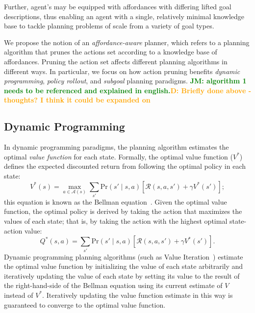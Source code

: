 \documentclass[]{article}
\newcommand{\jmnote}[1]{\textcolor{Green}{\textbf{JM: #1}}}
\newcommand{\dnote}[1]{\textcolor{Orange}{\textbf{D: #1}}}
\begin{document}
Further, agent's may be equipped with affordances with differing lifted
goal descriptions, thus enabling an agent with a single, relatively minimal
knowledge base to tackle planning problems of scale from a variety of goal types.

We propose the notion of an {\it affordance-aware} planner, which refers to
a planning algorithm that prunes the actions set according to a knowledge base
of affordances. Pruning the action set affects different planning algorithms in
different ways. In particular, we focus on how action pruning benefits
{\em dynamic programming}, {\em policy rollout}, and {\em subgoal} planning paradigms. \jmnote{algorithm 1 needs to be referenced and explained in english.}\dnote{Briefly done above - thoughts? I think it could be expanded on}

\subsection{Dynamic Programming}
In dynamic programming paradigms, the planning algorithm estimates the
optimal {\em value function} for each state. Formally, the optimal
value function ($V^*$) defines the expected discounted return from
following the optimal policy in each state:
\begin{equation}
\label{eq:bellman}
V^*(s) = \max_{a \in \mathcal{A}(s)} \sum_{s'} \text{Pr}(s' \mid s, a)\left[\mathcal{R}(s,a,s') + \gamma V^*(s') \right];
\end{equation}
this equation is known as the Bellman
equation~\citep{bellman57}. Given the optimal value function, the
optimal policy is derived by taking the action that maximizes the
values of each state; that is, by taking the action with the
highest optimal state-action value:
\begin{equation}
\label{eq:qvalue}
Q^*(s,a) = \sum_{s'} \text{Pr}(s' \mid s, a)\left[\mathcal{R}(s,a,s') + \gamma V^*(s') \right].
\end{equation}
Dynamic programming planning algorithms (such as Value
Iteration~\citep{bellman57}) estimate the optimal value function by
initializing the value of each state arbitrarily and iteratively
updating the value of each state by setting its value to the result of
the right-hand-side of the Bellman equation using its current estimate
of $V$ instead of $V^*$. Iteratively updating the value function
estimate in this way is guaranteed to converge to the optimal value
function.
\end{document}
